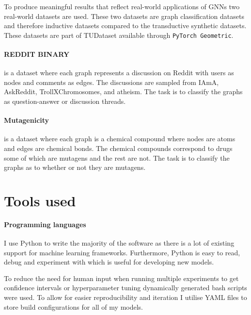 To produce meaningful results that reflect real-world applications of GNNs two real-world datasets are used.
These two datasets are graph classification datasets and therefore inductive datasets compared to the transductive synthetic datasets.
These datasets are part of TUDataset \cite{Morris+2020} available through \texttt{PyTorch Geometric}\cite{Fey/Lenssen/2019}.

\paragraph{REDDIT BINARY}
is a dataset where each graph represents a discussion on Reddit with users as nodes and comments as edges.
The discussions are sampled from IAmA, AskReddit, TrollXChromosomes, and atheism.
The task is to classify the graphs as question-answer or discussion threads.

\paragraph{Mutagenicity}
is a dataset where each graph is a chemical compound where nodes are atoms and edges are chemical bonds.
The chemical compounds correspond to drugs some of which are mutagens and the rest are not.
The task is to classify the graphs as to whether or not they are mutagens.

\section{Tools used}


\paragraph{Programming languages}
I use Python to write the majority of the software as there is a lot of existing support for machine learning frameworks.
Furthermore, Python is easy to read, debug and experiment with which is useful for developing new models.

To reduce the need for human input when running multiple experiments to get confidence intervals or hyperparameter tuning dynamically generated bash scripts were used.
To allow for easier reproducibility and iteration I utilise YAML files to store build configurations for all of my models.


